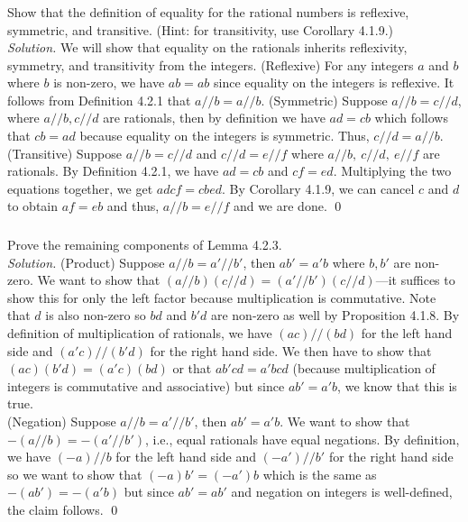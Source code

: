 \documentclass{amsart}
\theoremstyle{definition}
\newcommand{\soln}{\newline\textit{Solution.} }
\newcommand{\dvd}{//}
\begin{document}
\subsubsection{} Show that the definition of equality for the rational numbers is reflexive, symmetric, and transitive. (Hint: for transitivity, use Corollary 4.1.9.) \\
\soln We will show that equality on the rationals inherits reflexivity, symmetry, and transitivity from the integers. (Reflexive) For any integers $a$ and $b$ where $b$ is non-zero, we have $ab=ab$ since equality on the integers is reflexive. It follows from Definition 4.2.1 that $a\dvd b=a\dvd b$. (Symmetric) Suppose $a//b=c//d$, where $a//b, c//d$ are rationals, then by definition we have $ad=cb$ which follows that $cb=ad$ because equality on the integers is symmetric. Thus, $c//d=a//b$. (Transitive) Suppose $a//b=c//d$ and $c//d=e//f$ where $a//b,\ c//d,\ e//f$ are rationals. By Definition 4.2.1, we have $ad=cb$ and $cf=ed$. Multiplying the two equations together, we get $adcf=cbed$. By Corollary 4.1.9, we can cancel $c$ and $d$ to obtain $af=eb$ and thus, $a//b=e//f$ and we are done. \qed \\


\subsubsection{} Prove the remaining components of Lemma 4.2.3. \\
\soln (Product) Suppose $a//b=a'//b'$, then $ab'=a'b$ where $b,b'$ are non-zero. We want to show that $(a//b)(c//d)=(a'//b')(c//d)$---it suffices to show this for only the left factor because multiplication is commutative. Note that $d$ is also non-zero so $bd$ and $b'd$ are non-zero as well by Proposition 4.1.8. By definition of multiplication of rationals, we have $(ac)//(bd)$ for the left hand side and $(a'c)//(b'd)$ for the right hand side. We then have to show that $(ac)(b'd)=(a'c)(bd)$ or that $ab'cd=a'bcd$ (because multiplication of integers is commutative and associative) but since $ab'=a'b$, we know that this is true. \\

(Negation) Suppose $a//b=a'//b'$, then $ab'=a'b$. We want to show that $-(a//b)=-(a'//b')$, i.e., equal rationals have equal negations. By definition, we have $(-a)//b$ for the left hand side and $(-a')//b'$ for the right hand side so we want to show that $(-a)b'=(-a')b$ which is the same as $-(ab')=-(a'b)$ but since $ab'=ab'$ and negation on integers is well-defined, the claim follows. \qed \\
\end{document}
